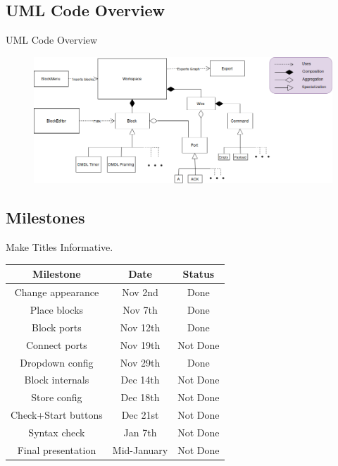 \documentclass{beamer}
\begin{document}
\subsection{UML Code Overview}
\begin{frame}{UML Code Overview}
\centering
	\begin{figure}
 		\includegraphics[width=\linewidth]{dmdl-editor.png}
		\label{fig:uml}
	\end{figure}
\end{frame}

\subsection{Milestones}
\begin{frame}{Make Titles Informative.}
\centering
	\begin{tabular}{|c|c|c|} \hline
		\textbf{Milestone} & \textbf{Date} & \textbf{Status} \\ \hline
		Change appearance & Nov 2nd & Done \\ \hline
		Place blocks & Nov 7th & Done \\ \hline
		Block ports & Nov 12th & Done \\ \hline
		Connect ports & Nov 19th & Not Done \\ \hline
		Dropdown config & Nov 29th & Done \\ \hline
		Block internals & Dec 14th & Not Done \\ \hline
		Store config & Dec 18th & Not Done \\ \hline
		Check+Start buttons & Dec 21st & Not Done \\ \hline
		Syntax check & Jan 7th & Not Done \\ \hline
		Final presentation & Mid-January & Not Done \\ \hline
	\end{tabular}
\end{frame}
\end{document}
